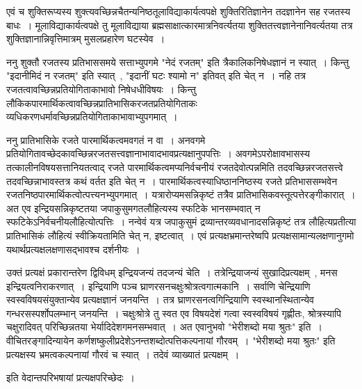 	एवं च शुक्तिरूप्यस्य शुक्त्यवच्छिन्नचैतन्यनिष्ठतूलाविद्याकार्यत्वपक्षे शुक्तिरितिज्ञानेन तदज्ञानेन सह रजतस्य बाधः~। मूलाविद्याकार्यत्वपक्षे तु मूलाविद्याया ब्रह्मसाक्षात्कारमात्रनिवर्त्यतया शुक्तितत्त्वज्ञानेनानिवर्त्यतया तत्र शुक्तिज्ञानान्निवृत्तिमात्रम् मुसलप्रहारेण घटस्येव~। \par
	ननु शुक्तौ रजतस्य प्रतिभाससमये सत्ताभ्युपगमे "नेदं रजतम्" इति त्रैकालिकनिषेधज्ञानं न स्यात्~। किन्तु "इदानीमिदं न रजतम्" इति स्यात्~, "इदानीं घटः श्यामो न" इतिवत् इति चेत् न~। नहि तत्र रजतत्वावच्छिन्नप्रतियोगिताकाभावो निषेधधीविषयः~। किन्तु लौकिकपारमार्थिकत्वावच्छिन्नप्रातिभासिकरजतप्रतियोगिताकः व्यधिकरणधर्मावच्छिन्नप्रतियोगिताकाभावाभ्युपगमात्~। \par
	ननु प्रातिभासिके रजते पारमार्थिकत्वमवगतं न वा~। अनवगमे प्रतियोगितावच्छेदकावच्छिन्नरजतसत्त्वज्ञानाभावादभावप्रत्यक्षानुपपत्तिः~। अवगमेऽपरोक्षावभासस्य तत्कालीनविषयसत्तानियतत्वाद् रजते पारमार्थिकत्वमप्यनिर्वचनीयं रजतदेवोत्पन्नमिति तदवच्छिन्नरजतसत्त्वे तदवच्छिन्नाभावस्तत्र कथं वर्तत इति चेत् न~। पारमार्थिकत्वस्याधिष्ठाननिष्ठस्य रजते प्रतिभाससम्भवेन रजतनिष्ठपारमार्थिकत्वोत्पत्त्यनभ्युपगमात्~। यत्रारोप्यमसन्निकृष्टं तत्रैव प्रातिभासिकवस्तूत्पत्तेरङ्गीकारात्~। अत एव इन्द्रियसन्निकृष्टतया जपाकुसुमगतलौहित्यस्य स्फटिके भानसम्भवात् न स्फटिकेऽनिर्वचनीयलौहित्योत्पत्तिः~। नन्वेवं यत्र जपाकुसुमं द्रव्यान्तरव्यवधानादसन्निकृष्टं तत्र लौहित्यप्रतीत्या प्रातिभासिकं लौहित्यं स्वीक्रियतामिति चेत् न, इष्टत्वात्~। एवं प्रत्यक्षभ्रमान्तरेष्वपि प्रत्यक्षसामान्यलक्षणानुगमो यथार्थप्रत्यक्षलक्षणासद्भावश्च दर्शनीयः~।\par
	उक्तं प्रत्यक्षं प्रकारान्तरेण द्विविधम् इन्द्रियजन्यं तदजन्यं चेति~। तत्रेन्द्रियाजन्यं सुखादिप्रत्यक्षम्~, मनस इन्द्रियत्वनिराकरणात्~। इन्द्रियाणि पञ्च घ्राणरसनचक्षुःश्रोत्रत्वगात्मकानि~। सर्वाणि चेन्द्रियाणि स्वस्वविषयसंयुक्तान्येव प्रत्यक्षज्ञानं जनयन्ति~। तत्र घ्राणरसनत्वगिन्द्रियाणि स्वस्थानस्थितान्येव गन्धरसस्पर्शोपलम्भान् जनयन्ति~। चक्षुःश्रोत्रे तु स्वत एव विषयदेशं गत्वा स्वस्वविषयं गृह्णीतः, श्रोत्रस्यापि चक्षुरादिवत् परिच्छिन्नतया भेर्यादिदेशगमनसम्भवात्~। अत एवानुभवो "भेरीशब्दो मया श्रुतः" इति~। वीचितरङ्गादिन्यायेन कर्णशष्कुलीप्रदेशेऽनन्तशब्दोत्पत्तिकल्पनायां गौरवम्~। "भेरीशब्दो मया श्रुतः" इति प्रत्यक्षस्य भ्रमत्वकल्पनायां गौरवं च स्यात्~। तदेवं व्याख्यातं प्रत्यक्षम्~।\\
	\begin{center} इति वेदान्तपरिभषायां प्रत्यक्षपरिच्छेदः~।\end{center} 
